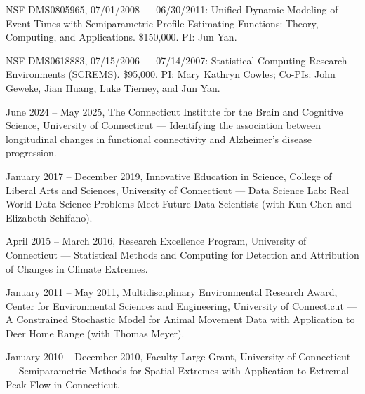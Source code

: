 \documentclass[Statistics]{vita}
\begin{document}
\begin{vita}
\begin{Grants}
\begin{External}
    \item NSF DMS0805965, 07/01/2008 --- 06/30/2011: Unified Dynamic Modeling of Event Times with Semiparametric Profile Estimating Functions: Theory, Computing, and Applications. \$150,000. PI: Jun Yan.
    \item NSF DMS0618883, 07/15/2006 --- 07/14/2007: Statistical Computing Research Environments (SCREMS). \$95,000. PI: Mary Kathryn Cowles; Co-PIs: John Geweke, Jian Huang, Luke Tierney, and Jun Yan.
  \end{External}
  \begin{Internal}
  \item June 2024 -- May 2025, The Connecticut Institute for the Brain and Cognitive Science, University of Connecticut ---  Identifying the association between longitudinal changes in functional connectivity and Alzheimer's disease progression.
  \item January 2017 -- December 2019, Innovative Education in Science, College of Liberal Arts and Sciences, University of Connecticut --- Data Science Lab: Real World Data Science Problems Meet Future Data Scientists (with Kun Chen and Elizabeth Schifano).
  \item April 2015 -- March 2016, Research Excellence Program, University of Connecticut --- Statistical Methods and Computing for Detection and Attribution of Changes in Climate Extremes.
  \item January 2011 -- May 2011, Multidisciplinary Environmental Research Award, Center for Environmental Sciences and Engineering, University of Connecticut --- A Constrained Stochastic Model for Animal Movement Data with Application to Deer Home Range (with Thomas Meyer).
  \item January 2010 -- December 2010, Faculty Large Grant, University of Connecticut --- Semiparametric Methods for Spatial Extremes with Application to Extremal Peak Flow in Connecticut.

\end{Internal}
\end{Grants}
\end{vita}
\end{document}
